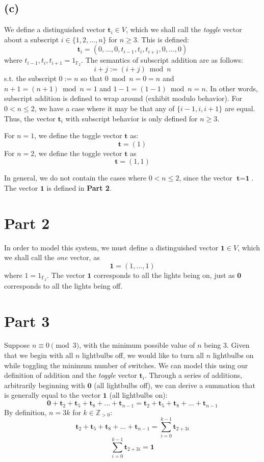 \documentclass[12pt, letterpaper]{article}
\newcommand{\F}{\mathbb{F}}
\newcommand{\Z}{\mathbb{Z}}
\newcommand{\0}{\textbf{0}}
\newcommand{\1}{\textbf{1}}
\renewcommand{\t}{\textbf{t}}
\begin{document}
\subsection*{(c)}

We define a distinguished vector $\t_i \in V$, which we shall call the \emph{toggle} vector about a subscript $i \in \{1, 2, ..., n\}$ for $ n \ge 3 $. This is defined: $$\t_i = (0, ..., 0, t_{i-1}, t_i, t_{i+1}, 0, ..., 0)$$ where $t_{i-1}, t_i, t_{i+1} = 1_{\F_2}$. The semantics of subscript addition are as follows: $$i+j := (i+j)\bmod{n}$$ s.t. the subscript $0 := n$ so that $0\bmod{n} = 0 = n$ and $n+1 = (n+1)\bmod{n} = 1$ and $1-1 = (1-1)\bmod{n} = n$. In other words, subscript addition is defined to wrap around (exhibit modulo behavior). For $0 < n \le 2$, we have a case where it may be that any of $\{i-1,i,i+1\}$ are equal. Thus, the vector $\t_i$ with subscript behavior is only defined for $n \ge 3$.

For $ n = 1 $, we define the toggle vector $\t$ as: $$\t = (1)$$ For $ n = 2$, we define the toggle vector $\t$ as $$\t = (1, 1)$$

In general, we do not contain the cases where $ 0 < n \le 2$, since the vector $\t = \1$. The vector $\1$ is defined in \textbf{Part 2}.

\section*{Part 2}

In order to model this system, we must define a distinguished vector $\1 \in V$, which we shall call the \emph{one} vector, as $$\1 = (1, ..., 1)$$ where $1=1_{\F_2}$. The vector $\1$ corresponds to all the lights being on, just as $\0$ corresponds to all the lights being off.

\section*{Part 3}

Suppose $n \equiv 0\pmod{3}$, with the minimum possible value of $n$ being $3$. Given that we begin with all $n$ lightbulbs off, we would like to turn all $n$ lightbulbs on while toggling the minimum number of switches. We can model this using our definition of addition and the \emph{toggle} vector $\t_i$. Through a series of additions, arbitrarily beginning with $\0$ (all lightbulbs off), we can derive a summation that is generally equal to the vector $\1$ (all lightbulbs on): $$\0 + \t_2 + \t_5 + \t_8 + ... + \t_{n-1} = \t_2 + \t_5 + \t_8 + ... + \t_{n-1}$$ 
By definition, $n =3k$ for $k \in \Z_{>0}$:
$$\t_2 + \t_5 + \t_8 + ... + \t_{n-1} = \sum_{i=0}^{k-1} \t_{2+3i}$$
$$\sum_{i=0}^{k-1} \t_{2+3i} = \1$$
\end{document}
